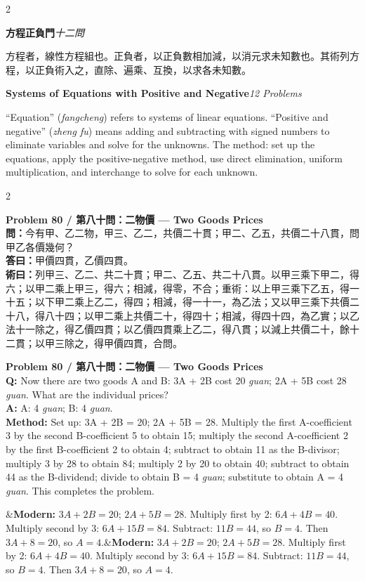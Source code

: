 \documentclass[11pt,a4paper]{article}
\newcommand{\bilingualproblem}[4]{%
  \begin{paracol}{2}
  \begin{leftcolumn}
  \noindent\textbf{\color{problemcolor}#1}\\[0.2cm]
  #2
  \end{leftcolumn}
  \switchcolumn
  \noindent\textbf{\color{problemcolor}#1}\\[0.2cm]
  #3
  \end{paracol}
  \ifx&#4&\else\vspace{0.3cm}\noindent#4\fi
  \vspace{0.5cm}
}
\newcommand{\wen}[1]{\textcolor{problemcolor}{\textbf{問：}}#1}
\newcommand{\da}[1]{\textcolor{answercolor}{\textbf{答曰：}}#1}
\newcommand{\shu}[1]{\textcolor{methodcolor}{\textbf{術曰：}}#1}
\newcommand{\wenen}[1]{\textcolor{problemcolor}{\textbf{Q:}} #1}
\newcommand{\daen}[1]{\textcolor{answercolor}{\textbf{A:}} #1}
\newcommand{\shuen}[1]{\textcolor{methodcolor}{\textbf{Method:}} #1}
\begin{document}
\begin{paracol}{2}
\begin{leftcolumn}
\noindent\textbf{方程正負門}\quad\textit{十二問}

方程者，線性方程組也。正負者，以正負數相加減，以消元求未知數也。其術列方程，以正負術入之，直除、遍乘、互換，以求各未知數。
\end{leftcolumn}

\switchcolumn

\noindent\textbf{Systems of Equations with Positive and Negative}\quad\textit{12 Problems}

``Equation'' (\textit{fangcheng}) refers to systems of linear equations. ``Positive and negative'' (\textit{zheng fu}) means adding and subtracting with signed numbers to eliminate variables and solve for the unknowns. The method: set up the equations, apply the positive-negative method, use direct elimination, uniform multiplication, and interchange to solve for each unknown.
\end{paracol}

\vspace{0.5cm}

\bilingualproblem{Problem 80 / 第八十問：二物價 --- Two Goods Prices}{
\wen{今有甲、乙二物，甲三、乙二，共價二十貫；甲二、乙五，共價二十八貫，問甲乙各價幾何？}\\[0.2cm]
\da{甲價四貫，乙價四貫。}\\[0.2cm]
\shu{列甲三、乙二、共二十貫；甲二、乙五、共二十八貫。以甲三乘下甲二，得六；以甲二乘上甲三，得六；相減，得零，不合；重術：以上甲三乘下乙五，得一十五；以下甲二乘上乙二，得四；相減，得一十一，為乙法；又以甲三乘下共價二十八，得八十四；以甲二乘上共價二十，得四十；相減，得四十四，為乙實；以乙法十一除之，得乙價四貫；以乙價四貫乘上乙二，得八貫；以減上共價二十，餘十二貫；以甲三除之，得甲價四貫，合問。}
}{
\wenen{Now there are two goods A and B: 3A + 2B cost 20 \textit{guan}; 2A + 5B cost 28 \textit{guan}. What are the individual prices?}\\[0.2cm]
\daen{A: 4 \textit{guan}; B: 4 \textit{guan}.}\\[0.2cm]
\shuen{Set up: 3A + 2B = 20; 2A + 5B = 28. Multiply the first A-coefficient 3 by the second B-coefficient 5 to obtain 15; multiply the second A-coefficient 2 by the first B-coefficient 2 to obtain 4; subtract to obtain 11 as the B-divisor; multiply 3 by 28 to obtain 84; multiply 2 by 20 to obtain 40; subtract to obtain 44 as the B-dividend; divide to obtain B = 4 \textit{guan}; substitute to obtain A = 4 \textit{guan}. This completes the problem.}
}{\textbf{Modern:} $3A + 2B = 20$; $2A + 5B = 28$. Multiply first by 2: $6A + 4B = 40$. Multiply second by 3: $6A + 15B = 84$. Subtract: $11B = 44$, so $B = 4$. Then $3A + 8 = 20$, so $A = 4$.}
\end{document}
